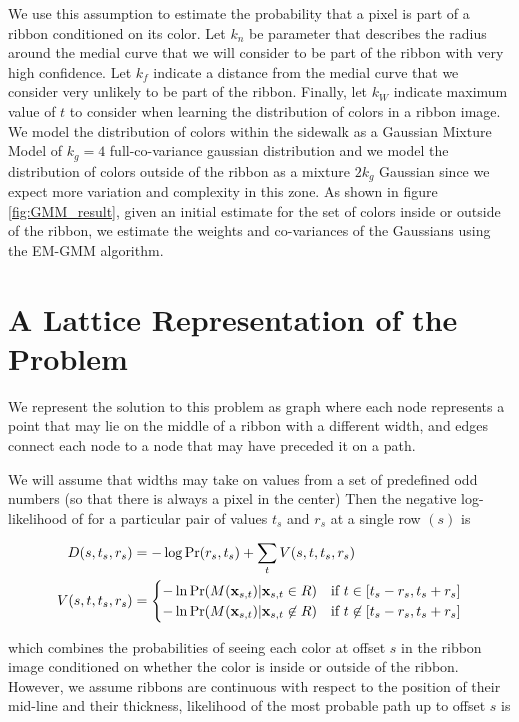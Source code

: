 We use this assumption to estimate the probability that a pixel is part of a ribbon conditioned on its color. Let $k_n$ be parameter that describes the radius around the medial curve that we will consider to be part of the ribbon with very high confidence. Let $k_f$ indicate a distance from the medial curve that we consider very unlikely to be part of the ribbon. Finally, let $k_W$ indicate maximum value of $t$ to consider when learning the distribution of colors in a ribbon image.  We model the distribution of colors within the sidewalk as a Gaussian Mixture Model of $k_g=4$ full-co-variance gaussian distribution and we model the distribution of colors outside of the ribbon as a mixture $2k_g$ Gaussian since we expect more variation and complexity in this zone. As shown in figure \ref{fig:GMM_result}, given an initial estimate for the set of colors inside or outside of the ribbon, we estimate the weights and co-variances of the Gaussians using the \ac{EM-GMM} \cite{sridharan2014gaussian} algorithm. 


\section{A Lattice Representation of the Problem} 
We represent the solution to this problem as graph where each node represents a point that may lie on the middle of a ribbon with a different width, and edges connect each node to a node that may have preceded it on a path. 

We will assume that widths may take on values from a set of predefined odd numbers (so that there is always a pixel in the center) 
Then the negative log-likelihood of for a particular pair of values $t_s$ and $r_s$ at a single row $(s)$ is 

\begin{align}
D(s, t_s, r_s) &= -\log \Pr(r_s, t_s)  + \sum_{t} V(s,t, t_s, r_s) \\
V(s, t, t_s, r_s) &= 
\begin{cases}
 -\ln\Pr(M(\mathbf{x}_{s,t})|\mathbf{x}_{s,t} \in R) &\text{if } t\in [t_s-r_s, t_s+r_s]\\
 -\ln\Pr(M(\mathbf{x}_{s,t})|\mathbf{x}_{s,t}\not\in R) &\text{if } t\not\in[t_s-r_s, t_s+r_s]
\end{cases}
\end{align}

which combines the probabilities of seeing each color at offset $s$ in the ribbon image conditioned on whether the color is inside or outside of the ribbon. However, we assume ribbons are continuous with respect to the position of their mid-line and their thickness, likelihood of the most probable path up to offset $s$ is 

